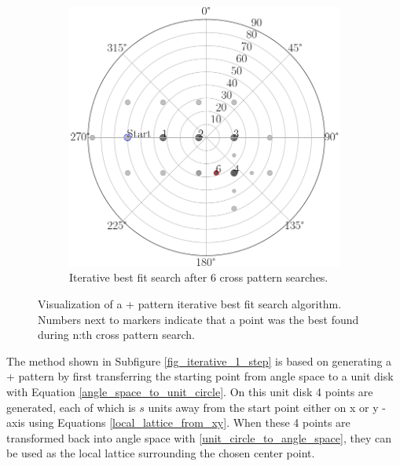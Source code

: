 \begin{figure}[H]
\begin{subfigure}[b]{0.45\textwidth}
         \includegraphics[width=\textwidth]{pics/iterative_6_step}
         \caption{Iterative best fit search after 6 cross pattern searches.}
         \label{fig_iterative_6_step}
     \end{subfigure}
     \hfill
     
     
\caption{Visualization of a + pattern iterative best fit search algorithm. Numbers next to markers indicate that a point was the best found during n:th cross pattern search.
}
     \label{fig_iterative_visual_1}
\end{figure}


\noindent The method shown in Subfigure \ref{fig_iterative_1_step} is based on generating a + pattern by first transferring the starting point from angle space to a unit disk with Equation \ref{angle_space_to_unit_circle}. On this unit disk 4 points are generated, each of which is $s$ units away from the start point either on x or y -axis using Equations \ref{local_lattice_from_xy}. When these 4 points are transformed back into angle space with \ref{unit_circle_to_angle_space}, they can be used as the local lattice surrounding the chosen center point.

